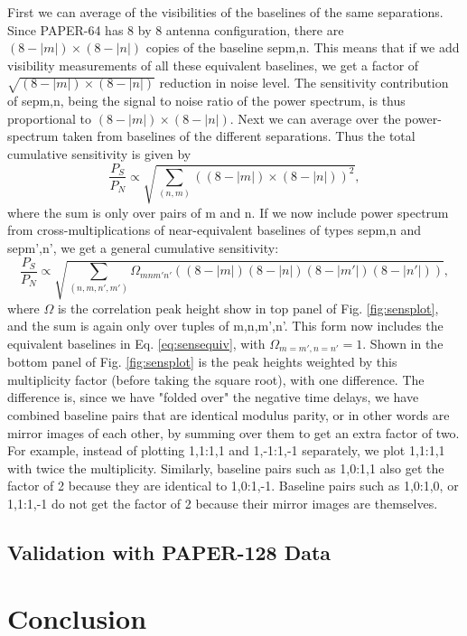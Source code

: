 \documentclass[preprint2,numberedappendix,tighten,twocolappendix]{aastex6}  %
\renewcommand\[{\begin{equation}}
\renewcommand\]{\end{equation}}
\begin{document}
First we can average of the visibilities of the baselines of the same
separations. Since PAPER-64 has 8 by 8 antenna configuration, there
are $(8-|m|)\times(8-|n|)$ copies of the baseline sepm,n. This means
that if we add visibility measurements of all these equivalent baselines,
we get a factor of $\sqrt{(8-|m|)\times(8-|n|)}$ reduction in noise
level. The sensitivity contribution of sepm,n, being the signal to
noise ratio of the power spectrum, is thus proportional to $(8-|m|)\times(8-|n|)$.
Next we can average over the power-spectrum taken from baselines of
the different separations. Thus the total cumulative sensitivity is
given by 
\begin{equation}
\frac{P_{S}}{P_{N}}\propto\sqrt{\sum_{(n,m)}\left((8-|m|)\times(8-|n|)\right)^{2}},\label{eq:sensequiv}
\end{equation}
where the sum is only over pairs of m and n. If we now include power
spectrum from cross-multiplications of near-equivalent baselines of
types sepm,n and sepm',n', we get a general cumulative sensitivity:
\small
\begin{equation}
\frac{P_{S}}{P_{N}}\propto\sqrt{\sum_{(n,m,n',m')}\Omega_{mnm'n'}\left((8-|m|)(8-|n|)(8-|m'|)(8-|n'|)\right)},\label{eq:sensul}
\end{equation}
\normalsize
where $\Omega$ is the correlation peak height show in top panel of Fig. \eqref{fig:sensplot},
and the sum is again only over tuples of m,n,m',n'. This form now
includes the equivalent baselines in Eq. \eqref{eq:sensequiv}, with
$\Omega_{m=m',n=n'}=1$. 
Shown in the bottom panel of Fig. \eqref{fig:sensplot} is the peak heights weighted
by this multiplicity factor (before taking the square root), with one difference. The difference is, 
since we have "folded over" the negative time delays, we have combined baseline pairs that are identical modulus parity, 
or in other words are mirror images of each other, by summing over them to get an extra factor of two. For example, 
instead of plotting 1,1:1,1 and 1,-1:1,-1 separately, we plot 1,1:1,1 with twice the multiplicity. Similarly, baseline pairs such as 
1,0:1,1 also get the factor of 2 because they are identical to 1,0:1,-1. Baseline pairs such as 1,0:1,0, or 1,1:1,-1 do not get
the factor of 2 because their mirror images are themselves. 

\subsection{Validation with PAPER-128 Data}

\section{Conclusion}



\end{document}
